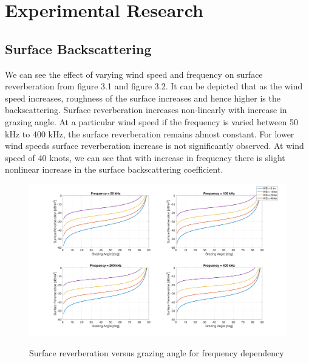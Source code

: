 \chapter*{Experimental Research}


\section{ Surface Backscattering } \label{ Surface Backscattering } 
\noindent  We can see the effect of varying wind speed and frequency on surface reverberation from figure 3.1 and figure 3.2. It can be depicted that as the wind speed increases, roughness of the surface increases and hence higher is the backscattering. Surface reverberation increases non-linearly with increase in grazing angle. At a particular wind speed if the frequency is varied between 50 kHz to 400 kHz, the surface reverberation remains almost constant. For lower wind speeds surface reverberation increase is not significantly observed. At wind speed of 40 knots, we can see that with increase in frequency there is slight nonlinear increase in the surface backscattering coefficient.

\begin{figure}[H]
\centering
{\includegraphics[scale=0.18]{usp3_1.png}}
\caption{Surface reverberation versus grazing angle for frequency dependency}
\end{figure}

